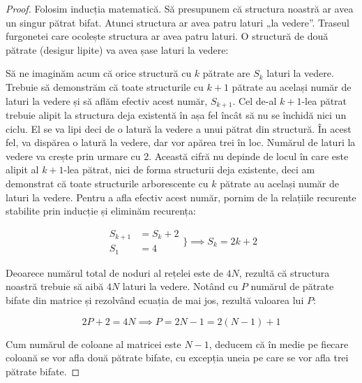 \begin{proof}
  Folosim inducția matematică. Să presupunem că structura noastră ar avea un
  singur pătrat bifat. Atunci structura ar avea patru laturi „la
  vedere”. Traseul furgonetei care ocolește structura ar avea patru laturi. O
  structură de două pătrate (desigur lipite) va avea șase laturi la vedere:


  Să ne imaginăm acum că orice structură cu $k$ pătrate are $S_k$ laturi la
  vedere. Trebuie să demonstrăm că toate structurile cu $k+1$ pătrate au
  același număr de laturi la vedere și să aflăm efectiv acest număr,
  $S_{k+1}$. Cel de-al $k+1$-lea pătrat trebuie alipit la structura deja
  existentă în așa fel încât să nu se închidă nici un ciclu. El se va lipi
  deci de o latură la vedere a unui pătrat din structură. În acest fel, va
  dispărea o latură la vedere, dar vor apărea trei în loc. Numărul de laturi
  la vedere va crește prin urmare cu 2. Această cifră nu depinde de locul în
  care este alipit al $k+1$-lea pătrat, nici de forma structurii deja
  existente, deci am demonstrat că toate structurile arborescente cu $k$
  pătrate au același număr de laturi la vedere. Pentru a afla efectiv acest
  număr, pornim de la relațiile recurente stabilite prin inducție și eliminăm
  recurența:

  \begin{equation}
    \begin{split}
      S_{k + 1} & = S_k + 2 \\
      S_1 & = 4
    \end{split}
    \Biggr\}
    \implies S_k = 2k + 2
  \end{equation}

  Deoarece numărul total de noduri al rețelei este de $4N$, rezultă că
  structura noastră trebuie să aibă $4N$ laturi la vedere. Notând cu $P$
  numărul de pătrate bifate din matrice și rezolvând ecuația de mai jos,
  rezultă valoarea lui $P$:

  \begin{equation}
    2P + 2 = 4N \implies P = 2N - 1 = 2(N - 1) + 1
  \end{equation}

  Cum numărul de coloane al matricei este $N-1$, deducem că în medie pe
  fiecare coloană se vor afla două pătrate bifate, cu excepția uneia pe care
  se vor afla trei pătrate bifate.
\end{proof}

